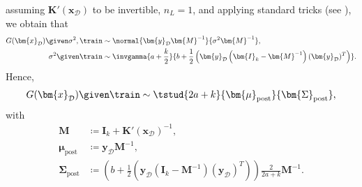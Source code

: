 assuming $\bm{K}'(\bm{x}_{\mathcal{D}})$ to be invertible, $n_L = 1$, and applying standard tricks (see ), we obtain that
\begin{equation*}
    \begin{aligned}
        G(\bm{x}_{\mathcal{D}}) \given \sigma^2, \train & \sim \normal{\bm{y}_{\mathcal{D}} \bm{M}^{-1}}{\sigma^2 \bm{M}^{-1}}, \\
        \sigma^{2} \given \train & \sim \invgamma{a + \frac{k}{2}}{b + \frac{1}{2} \left(\bm{y}_{\mathcal{D}} \left(\bm{I}_{k} - \bm{M}^{-1}\right) (\bm{y}_{\mathcal{D}})^T\right)}.
    \end{aligned}
\end{equation*}
Hence,
\begin{equation*}
    \begin{aligned}
        G(\bm{x}_{\mathcal{D}}) \given \train \sim \tstud{2a + k}{\bm{\mu}_{\mathrm{post}}}{\bm{\Sigma}_{\mathrm{post}}},
    \end{aligned}
\end{equation*}
with
\begin{equation} \label{eq:tstudpostparams}
    \begin{aligned}
        \bm{M} & \coloneqq \bm{I}_{k} + \bm{K}'(\bm{x}_{\mathcal{D}})^{-1}, \\
        \bm{\mu}_{\mathrm{post}} & \coloneqq \bm{y}_{\mathcal{D}} \bm{M}^{-1}, \\
        \bm{\Sigma}_{\mathrm{post}} & \coloneqq \left(b + \frac{1}{2} \left(\bm{y}_{\mathcal{D}} \left(\bm{I}_{k} - \bm{M}^{-1}\right) (\bm{y}_{\mathcal{D}})^T\right)\right) \frac{2}{2a + k} \bm{M}^{-1}.
    \end{aligned}
\end{equation}

